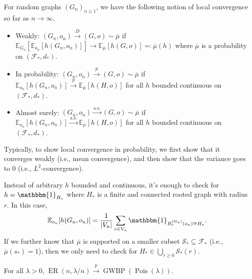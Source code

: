\begin{prev}
	For random graphs \((G_n)_{n \geq 1}\), we have the following notion of local convergence so far as \(n \to \infty \).
	\begin{itemize}
		\item Weakly: \((G_n, o_n) \overset{D}{\to} (G, o) \sim \overline{\mu} \) if \(\mathbb{E}_{G_n}[\mathbb{E}_{o_n}[h(G_n, o_n)] ] \to \mathbb{E}_{\overline{\mu} }[h(G, o)] \eqqcolon \overline{\mu} (h)\) where \(\overline{\mu} \) is a probability on \((\mathcal{F} _{\ast} , d_{\ast} )\).
		\item In probability: \((G_n, o_n) \overset{p}{\to} (G, o) \sim \overline{\mu} \) if \(\mathbb{E}_{o_n}[h(G_n, o_n)] \overset{p}{\to} \mathbb{E}_{\overline{\mu} }[h(H, o)] \) for all \(h\) bounded continuous on \((\mathcal{F} _{\ast} , d_{\ast} )\).
		\item Almost surely: \((G_n, o_n) \overset{\text{a.s.} }{\to} (G, o) \sim \overline{\mu} \) if \(\mathbb{E}_{o_n}[h(G_n, o_n)] \overset{\text{a.s.} }{\to} \mathbb{E}_{\overline{\mu} }[h(H, o)] \) for all \(h\) bounded continuous on \((\mathcal{F} _{\ast} , d_{\ast} )\).
	\end{itemize}
\end{prev}

\begin{remark}
	Typically, to show local convergence in probability, we first show that it converges weakly (i.e., mean convergence), and then show that the variance goes to \(0\) (i.e., \(L^2\)-convergence).
\end{remark}

\begin{remark}
	Instead of arbitrary \(h\) bounded and continuous, it's enough to check for \(h = \mathbbm{1}_{H_{\ast} } \) where \(H_{\ast} \) is a finite and connected rooted graph with radius \(r\). In this case,
	\[
		\mathbb{E}_{o_n}[h(G_n, o_n)]
		= \frac{1}{\lvert V_n \rvert } \sum_{v \in V_n} \mathbbm{1}_{B_r^{(G_n)}(o_n) \cong H_{\ast} } .
	\]
	If we further know that \(\overline{\mu} \) is supported on a smaller subset \(\mathcal{S} _{\ast} \subseteq \mathcal{F} _{\ast} \) (i.e., \(\overline{\mu} (s_{\ast} ) = 1\)), then we only need to check for \(H_{\ast} \in \bigcup_{r \geq 0} \mathcal{S} _{\ast} (r)\).
\end{remark}

\begin{eg}
	For all \(\lambda > 0\), \(\operatorname{ER}(n, \lambda / n) \overset{p}{\to} \operatorname{GWBP}(\operatorname{Pois}(\lambda ) ) \).
\end{eg}

